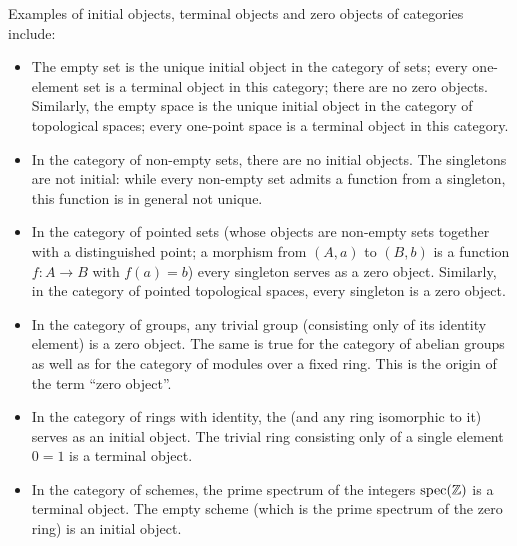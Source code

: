 \documentclass[12pt]{article}
\begin{document}

Examples of initial objects, terminal objects and zero objects of categories include:

\begin {itemize}

\item The empty set is the unique initial object in the category of sets; every one-element set is a terminal object in this category; there are no zero objects.
Similarly, the empty space is the unique initial object in the category of topological spaces; every one-point space is a terminal object in this category.

\item In the category of non-empty sets, there are no initial objects. The singletons are not initial: while every non-empty set admits a function from a singleton, this function is in general not unique.

\item In the category of pointed sets (whose objects are non-empty sets together with a distinguished point; a morphism from $(A,a)$ to $(B,b)$ is a function $f : A \to B$ with $f(a)=b$) every singleton serves as a zero object. Similarly, in the category of pointed topological spaces, every singleton is a zero object.

\item In the category of groups, any trivial group (consisting only of its identity element) is a zero object. The same is true for the category of abelian groups as well as for the category of modules over a fixed ring. This is the origin of the term ``zero object''.

\item In the category of rings with identity, the  (and any ring isomorphic to it) serves as an initial object. The trivial ring consisting only of a single element $0=1$ is a terminal object.

\item In the category of schemes, the prime spectrum of the integers $\operatorname{spec}(\Bbb{Z})$ is a terminal object. The empty scheme (which is the prime spectrum of the zero ring) is an initial object.


\end{itemize}
\end{document}
